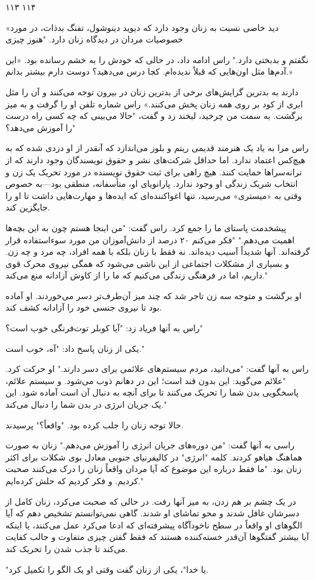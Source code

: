 ۱۱۳ ۱۱۴

«دید خاصی نسبت به زنان وجود دارد که دیوید دینوشول، تفنگ بدذات، در مورد خصوصیات مردان در دیدگاه زنان دارد. "هنوز چیزی

نگفتم و بدبختی دارد." راس ادامه داد، در حالی که خودش را به خشم رسانده بود. «این آدم‌ها مثل اون‌هایی که قبلاً ندیده‌ام. کجا درس می‌دهید؟ دوست دارم بیشتر بدانم.»

دارند به بدترین گرایش‌های برخی از بدترین زنان در بیرون توجه می‌کنند و آن را مثل ابری از کود بر روی همه زنان پخش می‌کنند.» راس شماره تلفن او را گرفت و به میز برگشت. به سمت من چرخید، لبخند زد و گفت، "حالا می‌بینی که چه کسی راه درست را آموزش می‌دهد؟"

راس مرا به یاد یک هنرمند قدیمی ریتم و بلوز می‌اندازد که آنقدر از او دزدی شده که به هیچ‌کس اعتماد ندارد. اما حداقل شرکت‌های نشر و حقوق نویسندگان وجود دارند که از ترانه‌سراها حمایت کنند. هیچ راهی برای ثبت حقوق نویسنده در مورد تحریک یک زن و انتخاب شریک زندگی او وجود ندارد. پارانویای او، متأسفانه، منطقی بود—به خصوص وقتی به «میستری» می‌رسید، تنها اغواکننده‌ای که ایده‌ها و مهارت‌هایی داشت تا او را جایگزین کند.

پیشخدمت پاستای ما را جمع کرد. راس گفت: "من اینجا هستم چون به این بچه‌ها اهمیت می‌دهم." "فکر می‌کنم ۲۰ درصد از دانش‌آموزان من مورد سوءاستفاده قرار گرفته‌اند. آنها شدیداً آسیب دیده‌اند. نه فقط با زنان بلکه با همه افراد، چه مرد و چه زن. و بسیاری از مشکلات اجتماعی از این ناشی می‌شود که همگی نیروی محرک قوی داریم، اما در فرهنگی زندگی می‌کنیم که ما را از کاوش آزادانه منع می‌کند."

او برگشت و متوجه سه زن تاجر شد که چند میز آن‌طرف‌تر دسر می‌خوردند. او آماده بود تا نیروی جنسی خود را آزادانه کشف کند.

راس به آنها فریاد زد: "آیا کوبلر توت‌فرنگی خوب است؟"

یکی از زنان پاسخ داد: "آه، خوب است."

راس به آنها گفت: "می‌دانید، مردم سیستم‌های علائمی برای دسر دارند." او حرکت کرد. "علائم می‌گوید: این بدون قند است؛ این در دهانم ذوب می‌شود. و سیستم علائم، پاسخگویی بدن شما را تحریک می‌کنند تا برای آنچه به دنبال آن است آماده شود. این یک جریان انرژی در بدن شما را دنبال می‌کند."

حالا توجه زنان را جلب کرده بود. "واقعاً؟" پرسیدند.

راسی به آنها گفت: "من دوره‌های جریان انرژی را آموزش می‌دهم." زنان به صورت هماهنگ هیاهو کردند. کلمه "انرژی" در کالیفرنیای جنوبی معادل بوی شکلات برای اکثر زنان بود. "ما فقط درباره این موضوع که آیا مردان واقعاً زنان را درک می‌کنند صحبت کردیم. و فکر کردیم که حلش کرده‌ایم."

در یک چشم بر هم زدن، به میز آنها رفت. در حالی که صحبت می‌کرد، زنان کامل از دسرشان غافل شدند و محو تماشای او شدند. گاهی نمی‌توانستم تشخیص دهم که آیا الگوهای او واقعاً در سطح ناخودآگاه پیشرفته‌ای که ادعا می‌کرد عمل می‌کنند، یا اینکه آیا بیشتر گفتگوها آن‌قدر خسته‌کننده هستند که فقط گفتن چیزی متفاوت و جالب کفایت می‌کند تا جذب شدن را تحریک کند.

"یا خدا"، یکی از زنان گفت وقتی او یک الگو را تکمیل کرد.